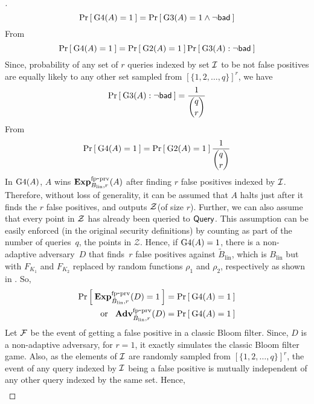\begin{proof}[]
\begin{equation}
\Pr\left[\: \text{G4}(A)=1 \:\right] = \Pr\left[\: \text{G3}(A)=1 \wedge \neg\mathsf{bad} \:\right]\label{eq:3}
\end{equation}
From 
\begin{equation}
\Pr\left[\: \text{G4}(A)=1 \:\right] =  \Pr\left[\: \text{G2}(A)=1 \:\right] \Pr\left[\: \text{G3}(A) : \neg\mathsf{bad} \:\right] \label{eq:4}
\end{equation}
Since, probability of any set of $r$ queries indexed by set ${\cal I}$ to be not false positives are equally likely to any other set sampled from $[\{1,2,\ldots,q\}]^r$, we have
\begin{equation}
\Pr\left[\: \text{G3}(A) : \neg\mathsf{bad} \:\right] = \frac{1}{\dbinom{q}{r}}\label{eq:555}
\end{equation}
From 
\begin{equation}
\Pr\left[\: \text{G4}(A)=1 \:\right] = \Pr\left[\: \text{G2}(A)=1 \:\right]\frac{1}{\dbinom{q}{r}}\label{eq:6}
\end{equation}
In $\text{G4}(A)$, $A$ wins $\mathrm{\mathbf{Exp}}^{\mathrm{fp\mbox{-}prv}}_{B_{\mathrm{lin}},r}(A)$ after finding $r$ false positives indexed by ${\cal I}$. Therefore, without loss of generality, it can be assumed that $A$ halts just after it finds the $r$ false positives, and outputs ${\cal Z}$(of size $r$). Further, we can also assume that every point in ${\cal Z}$ has already been queried to $\mathsf{Query}$. This assumption can be  easily enforced (in the original security definitions) by counting as part of the number of queries~$q$, the points in $\mathcal{Z}$. Hence, if $\text{G4}(A)=1$, there is a non-adaptive adversary~$D$ that finds~$r$ false positives against $\tilde{B}_{\mathrm{lin}}$, which is $B_{\mathrm{lin}}$ but with $F_{K_1}$ and $F_{K_2}$ replaced by random functions $\rho_1$ and $\rho_2$, respectively as shown in . So,
\begin{align}
\nonumber \Pr\left[\: \mathrm{\mathbf{Exp}}^{\mathrm{fp\mbox{-}prv}}_{\tilde{B}_{\mathrm{lin}},r}(D) = 1 \:\right] &= \Pr\left[\: \text{G4}(A) = 1 \:\right]\\
\mathrm{or} \hspace*{2ex} \mathrm{\mathbf{Adv}}^{\mathrm{fp\mbox{-}prv}}_{\tilde{B}_{\mathrm{lin}},r}(D) &= \Pr\left[\: \text{G4}(A) = 1 \:\right]\label{eq:7}
\end{align}
Let ${\cal F}$ be the event of getting a false positive in a classic Bloom filter. Since, $D$ is a non-adaptive adversary, for $r=1$, it exactly simulates the classic Bloom filter game. Also, as the elements of ${\cal I}$ are randomly sampled from $[\{1,2,\ldots,q\}]^r$, the event of any query indexed by ${\cal I}$ being a false positive is mutually independent of any other query indexed by the same set. Hence,
\begin{align}

\end{align}
\end{proof}
